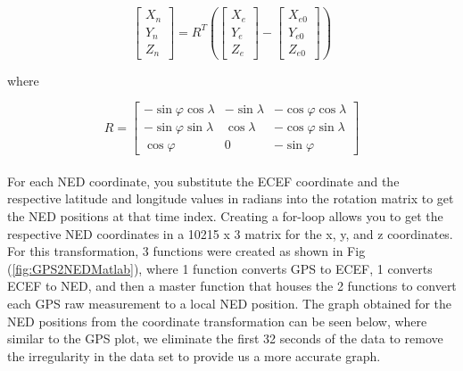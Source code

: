 \begin{equation}
\begin{bmatrix}
X_n \\
Y_n \\
Z_n
\end{bmatrix}
=
R^T
\left(
\begin{bmatrix}
X_e \\
Y_e \\
Z_e
\end{bmatrix}
-
\begin{bmatrix}
X_{e0} \\
Y_{e0} \\
Z_{e0}
\end{bmatrix}
\right)
\label{ECEF2NED}
\end{equation}

where

\begin{equation}
R =
\begin{bmatrix}
-\sin \varphi \cos \lambda & -\sin \lambda & -\cos \varphi \cos \lambda \\
-\sin \varphi \sin \lambda & \cos \lambda & -\cos \varphi \sin \lambda \\
\cos \varphi & 0 & -\sin \varphi
\end{bmatrix}
\end{equation}
\\
For each NED coordinate, you substitute the ECEF coordinate and the respective latitude and longitude values in radians into the rotation matrix to get the NED positions at that time index. Creating a for-loop allows you to get the respective NED coordinates in a 10215 x 3 matrix for the x, y, and z coordinates. For this transformation, 3 functions were created as shown in Fig (\ref{fig:GPS2NEDMatlab}), where 1 function converts GPS to ECEF, 1 converts ECEF to NED, and then a master function that houses the 2 functions to convert each GPS raw measurement to a local NED position. The graph obtained for the NED positions from the coordinate transformation can be seen below, where similar to the GPS plot, we eliminate the first 32 seconds of the data to remove the irregularity in the data set to provide us a more accurate graph.

